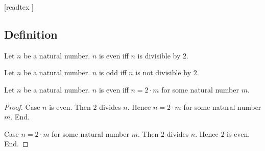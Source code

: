 \documentclass[10pt]{article}
\begin{document}
  \begin{imports}
    \begin{forthel}
      [readtex ]
    \end{forthel}
  \end{imports}


  \subsection{Definition}

  \begin{forthel}
    \begin{definition}
      Let $n$ be a natural number.
      $n$ is even iff $n$ is divisible by $2$.
    \end{definition}
  \end{forthel}

  \begin{forthel}
    \begin{definition}
      Let $n$ be a natural number.
      $n$ is odd iff $n$ is not divisible by $2$.
    \end{definition}
  \end{forthel}

  \begin{forthel}
    \begin{proposition}
      Let $n$ be a natural number.
      $n$ is even iff $n = 2 \cdot m$ for some natural number $m$.
    \end{proposition}
    \begin{proof}
      Case $n$ is even.
        Then $2$ divides $n$.
        Hence $n = 2 \cdot m$ for some natural number $m$.
      End.

      Case $n = 2 \cdot m$ for some natural number $m$.
        Then $2$ divides $n$.
        Hence $2$ is even.
      End.
    \end{proof}
  \end{forthel}
\end{document}
